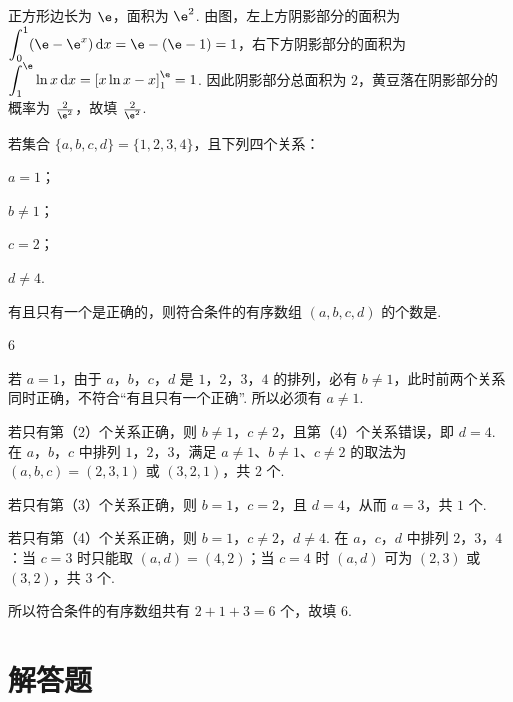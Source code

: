 \begin{solution}
正方形边长为 \(\e\)，面积为 \(\e^2\). 由图，左上方阴影部分的面积为
\(\displaystyle\int_0^1(\e-\e^x)\,\mathrm{d}x=\e-(\e-1)=1\)，右下方阴影部分的面积为
\(\displaystyle\int_1^{\e}\ln x\,\mathrm{d}x=\left[x\ln x-x\right]_1^{\e}=1\).
因此阴影部分总面积为 \(2\)，黄豆落在阴影部分的概率为 \(\frac{2}{\e^2}\)，故填 \(\frac{2}{\e^2}\).
\end{solution}

\begin{problem}
若集合 \(\{a, b, c, d\} = \{1, 2, 3, 4\}\)，且下列四个关系：

\begin{circlelist}
\item \(a = 1\)；
\item \(b \neq 1\)；
\item \(c = 2\)；
\item \(d \neq 4\).
\end{circlelist}

有且只有一个是正确的，则符合条件的有序数组 \((a, b, c, d)\) 的个数是\fillinblank{}.
\end{problem}

\begin{answer}
6
\end{answer}

\begin{solution}
若 \(a=1\)，由于 \(a\)，\(b\)，\(c\)，\(d\) 是 \(1\)，\(2\)，\(3\)，\(4\) 的排列，必有 \(b\neq1\)，此时前两个关系同时正确，不符合“有且只有一个正确”. 所以必须有 \(a\neq1\).

若只有第（2）个关系正确，则 \(b\neq1\)，\(c\neq2\)，且第（4）个关系错误，即 \(d=4\). 在 \(a\)，\(b\)，\(c\) 中排列 \(1\)，\(2\)，\(3\)，满足 \(a\neq1\)、\(b\neq1\)、\(c\neq2\) 的取法为 \((a,b,c)=(2,3,1)\) 或 \((3,2,1)\)，共 \(2\) 个.

若只有第（3）个关系正确，则 \(b=1\)，\(c=2\)，且 \(d=4\)，从而 \(a=3\)，共 \(1\) 个.

若只有第（4）个关系正确，则 \(b=1\)，\(c\neq2\)，\(d\neq4\). 在 \(a\)，\(c\)，\(d\) 中排列 \(2\)，\(3\)，\(4\)：当 \(c=3\) 时只能取 \((a,d)=(4,2)\)；当 \(c=4\) 时 \((a,d)\) 可为 \((2,3)\) 或 \((3,2)\)，共 \(3\) 个.

所以符合条件的有序数组共有 \(2+1+3=6\) 个，故填 \(6\).
\end{solution}

\section{解答题}

